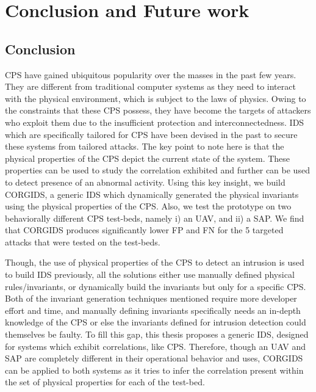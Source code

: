 
\chapter{\textbf{Conclusion and Future work}}
\label{sec8:Conclusion}

\section{Conclusion}

\ac{CPS} have gained ubiquitous popularity over the masses in the past few years. They are different from traditional computer systems as they need to interact with the physical environment, which is subject to the laws of physics. Owing to the constraints that these \ac{CPS} possess, they have become the targets of attackers who exploit them due to the insufficient protection and interconnectedness. \ac{IDS} which are specifically tailored for \ac{CPS} have been devised in the past to secure these systems from tailored attacks. The key point to note here is that the physical properties of the \ac{CPS} depict the current state of the system. These properties can be used to study the correlation exhibited and further can be used to detect presence of an abnormal activity. Using this key insight, we build \acf{CORGIDS}, a generic \ac{IDS} which dynamically generated the physical invariants using the physical properties of the \ac{CPS}. Also, we test the prototype on two behaviorally different \ac{CPS} test-beds, namely i) an \ac{UAV}, and ii) a \acf{SAP}. We find that \ac{CORGIDS} produces significantly lower \ac{FP} and \ac{FN} for the 5 targeted attacks that were tested on the test-beds.

Though, the use of physical properties of the \ac{CPS} to detect an intrusion is used to build \ac{IDS} previously, all the solutions either use manually defined physical rules/invariants, or dynamically build the invariants but only for a specific \ac{CPS}. Both of the invariant generation techniques mentioned require more developer effort and time, and manually defining invariants specifically needs an in-depth knowledge of the \ac{CPS} or else the invariants defined for intrusion detection could themselves be faulty. To fill this gap, this thesis proposes a generic \ac{IDS}, designed for systems which exhibit correlations, like \ac{CPS}. Therefore, though an \ac{UAV} and \ac{SAP} are completely different in their operational behavior and uses, \ac{CORGIDS} can be applied to both systems as it tries to infer the correlation present within the set of physical properties for each of the test-bed.
 
